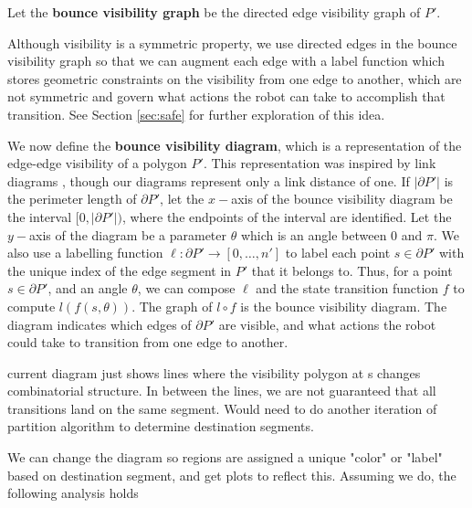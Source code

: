 \documentclass[]{styles/svproc}  %
\begin{document}
\begin{definition}
Let the \textbf{bounce visibility graph} be the directed edge visibility graph of
$P'$.
\end{definition}

Although visibility is a symmetric property, we use directed edges in the
bounce visibility graph so that 
we can augment each edge with a label function which stores
geometric constraints on the visibility from one edge to another, which are
not symmetric and govern what actions the robot can take to accomplish that
transition. See Section \ref{sec:safe} for further exploration of this idea.

We now define the \textbf{bounce visibility diagram}, which is a
representation of the edge-edge visibility of a polygon $P'$. This representation
was inspired by link diagrams \cite{efrat2000sweeping,tan_sweep}, though our
diagrams represent only a link distance of one.
If $|\partial P'|$ is the perimeter length of $\partial P'$, let the $x-$axis of the
bounce visibility diagram be the interval $[0, |\partial P'|)$, where the
endpoints of the interval are identified. Let the $y-$axis of the diagram be a
parameter $\theta$ which is an angle between $0$ and $\pi$.
We also use a labelling function $\ell: \partial P' \to [0, \ldots, n']$ to
label each point $s \in \partial P'$ with the unique index of the edge segment in $P'$ that it
belongs to. Thus, for a point $s \in \partial P'$, and an angle $\theta$, we can
compose $\ell$ and the state transition function $f$ to compute
$l(f(s,\theta))$. The graph of $l \circ f$ is the bounce visibility diagram. The
diagram indicates which edges
of $\partial P'$ are visible, and what actions the robot could take to
transition from one edge to another.

{\color{red} current diagram just shows lines where the visibility polygon at s
changes combinatorial structure. In between the lines, we are not guaranteed
that all transitions land on the same segment. Would need to do another
iteration of partition algorithm to determine destination segments.}

{\color{red} We can change the diagram so regions are assigned a unique "color" or "label" based on
destination segment, and get plots to reflect this. Assuming we do, the
following analysis holds}
\end{document}
